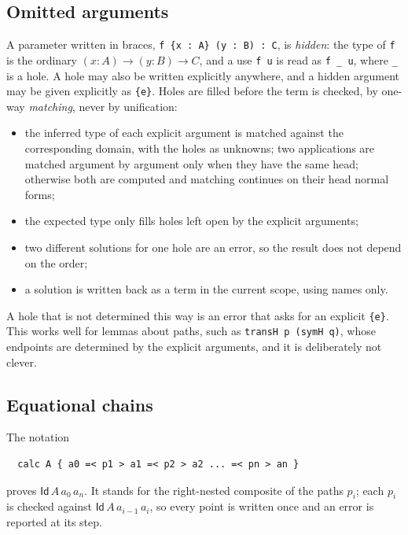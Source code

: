 \documentclass[11pt]{article}
\newcommand{\kw}[1]{\texttt{#1}}
\newcommand{\Id}{\mathsf{Id}}
\theoremstyle{remark}
\begin{document}
\subsection{Omitted arguments}\label{sec:hidden}

A parameter written in braces, \kw{f \{x : A\} (y : B) : C}, is
\emph{hidden}: the type of \kw{f} is the ordinary
$(x:A)\to(y:B)\to C$, and a use \kw{f u} is read as \kw{f \_ u}, where
\kw{\_} is a hole. A hole may also be written explicitly anywhere, and a
hidden argument may be given explicitly as \kw{\{e\}}. Holes are filled
before the term is checked, by one-way \emph{matching}, never by
unification:
\begin{itemize}
\item the inferred type of each explicit argument is matched against the
  corresponding domain, with the holes as unknowns; two applications are
  matched argument by argument only when they have the same head;
  otherwise both are computed and matching continues on their head normal
  forms;
\item the expected type only fills holes left open by the explicit
  arguments;
\item two different solutions for one hole are an error, so the result
  does not depend on the order;
\item a solution is written back as a term in the current scope, using
  names only.
\end{itemize}
A hole that is not determined this way is an error that asks for an
explicit \kw{\{e\}}. This works well for lemmas about paths, such as
\kw{transH p (symH q)}, whose endpoints are determined by the explicit
arguments, and it is deliberately not clever.

\subsection{Equational chains} The notation
\begin{verbatim}
  calc A { a0 =< p1 > a1 =< p2 > a2 ... =< pn > an }
\end{verbatim}
proves $\Id\,A\,a_0\,a_n$. It stands for the right-nested composite of
the paths $p_i$; each $p_i$ is checked against $\Id\,A\,a_{i-1}\,a_i$, so
every point is written once and an error is reported at its step.
\end{document}
